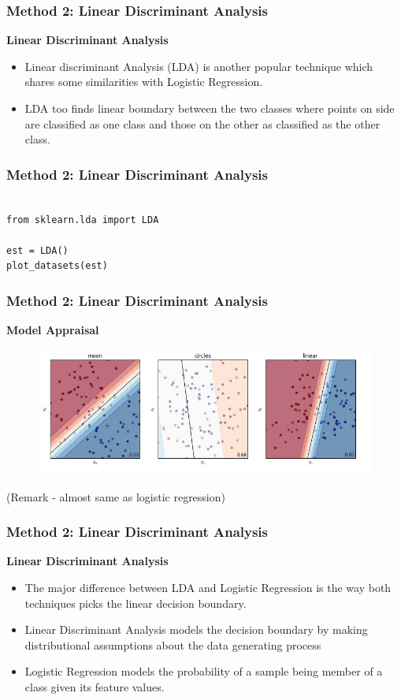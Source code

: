 \documentclass[MASTER.tex]{subfiles}
\begin{document}
\begin{frame}
\frametitle{Method 2: Linear Discriminant Analysis}
\Large
\textbf{Linear Discriminant Analysis}
\begin{itemize}
\item Linear discriminant Analysis (LDA) is another popular technique which shares some similarities with Logistic Regression. 
\item LDA too finds linear boundary between the two classes where points on side are classified as one class and those on the other as classified as the other class.
\end{itemize}

\end{frame}

\begin{frame}[fragile]
\frametitle{Method 2: Linear Discriminant Analysis}	
\Large
\begin{framed}
\begin{verbatim}

from sklearn.lda import LDA

est = LDA()
plot_datasets(est)
		\end{verbatim}
	\end{framed}
\end{frame}
\begin{frame}
\frametitle{Method 2: Linear Discriminant Analysis}
\textbf{Model Appraisal}
\begin{figure}
\centering
\includegraphics[width=0.95\linewidth]{sklcass/sklclass15}

\end{figure}
(Remark - almost same as logistic regression)
\end{frame}
\begin{frame}
	\frametitle{Method 2: Linear Discriminant Analysis}
\Large
\textbf{Linear Discriminant Analysis}
\begin{itemize}
\item The major difference between LDA and Logistic Regression is the way both techniques picks the linear decision boundary.
\item  Linear Discriminant Analysis models the decision boundary by making distributional assumptions about the data generating process 
\item Logistic Regression models the probability of a sample being member of a class given its feature values.
\end{itemize}
\end{frame}
\end{document}
